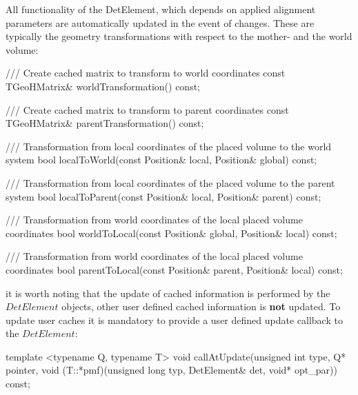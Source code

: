 \documentclass[10pt,a4paper]{article}
\begin{document}
\noindent
All functionality of the DetElement, which depends on applied alignment parameters
are automatically updated in the event of changes. These are typically the geometry 
transformations with respect to the mother- and the world volume:
\begin{code}
      /// Create cached matrix to transform to world coordinates
      const TGeoHMatrix& worldTransformation() const;

      /// Create cached matrix to transform to parent coordinates
      const TGeoHMatrix& parentTransformation() const;
 
      /// Transformation from local coordinates of the placed volume to the world system
      bool localToWorld(const Position& local, Position& global) const;

      /// Transformation from local coordinates of the placed volume to the parent system
      bool localToParent(const Position& local, Position& parent) const;

      /// Transformation from world coordinates of the local placed volume coordinates
      bool worldToLocal(const Position& global, Position& local) const;

      /// Transformation from world coordinates of the local placed volume coordinates
      bool parentToLocal(const Position& parent, Position& local) const;
\end{code}
it is worth noting that the update of cached information is performed by the $DetElement$ 
objects, other user defined cached information is {\bf{not}} updated. To update 
user caches it is mandatory to provide a user defined update callback to the $DetElement$:
\begin{code}
    template <typename Q, typename T> 
    void callAtUpdate(unsigned int type, Q* pointer, 
                      void (T::*pmf)(unsigned long typ, DetElement& det, void* opt_par)) const;
\end{code}
\end{document}
